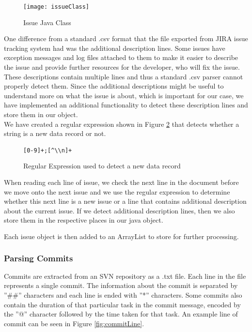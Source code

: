 \begin{figure}
\centering
\texttt{[image: issueClass]}
\caption{Issue Java Class}
\label{fig:issue}
\end{figure}

One difference from a standard .csv format that the file exported from JIRA issue tracking system had was the additional description lines. Some issues have exception messages and log files attached to them to make it easier to describe the issue and provide further resources for the developer, who will fix the issue.
These descriptions contain multiple lines and thus a standard .csv parser cannot properly detect them.
Since the additional descriptions might be useful to understand more on what the issue is about, which is important for our case, we have implemented an additional functionality to detect these description lines and store them in our object.\\

We have created a regular expression shown in Figure \ref{fig:regexp} that detects whether a string is a new data record or not.

\begin{figure}
\centering
\verb/[0-9]+;[^\\n]+/
\caption{Regular Expression used to detect a new data record}
\label{fig:regexp}
\end{figure}

When reading each line of issue, we check the next line in the document before we move onto the next issue and we use the regular expression to determine whether this next line is a new issue or a line that contains additional description about the current issue.
If we detect additional description lines, then we also store them in the respective places in our java object.

Each issue object is then added to an ArrayList to store for further processing.

\subsubsection{Parsing Commits}

Commits are extracted from an SVN repository as a .txt file.
Each line in the file represents a single commit.
The information about the commit is separated by ''\#\#'' characters and each line is ended with ''\**'' characters.
Some commits also contain the duration of that particular task in the commit message, encoded by the ''@'' character followed by the time taken for that task.
An example line of commit can be seen in Figure \ref{fig:commitLine}.\\

